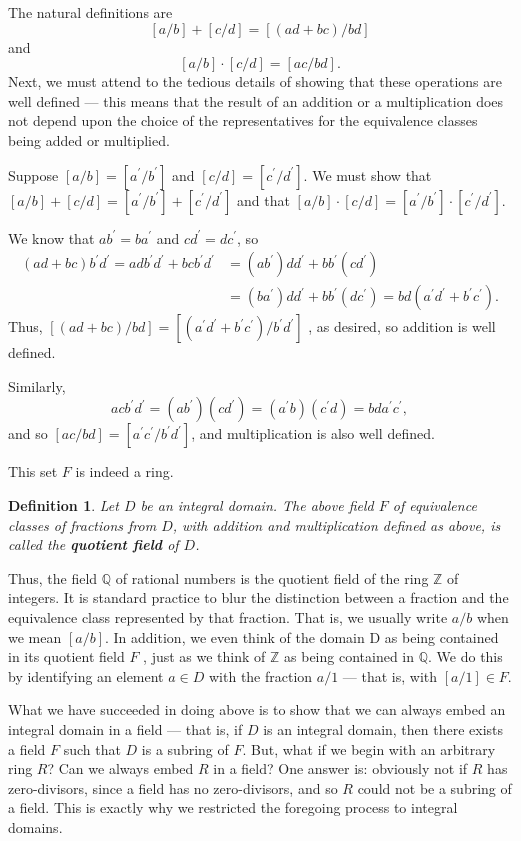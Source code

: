 \documentclass[12pt,reqno]{amsart}
\theoremstyle{plain}
\newtheorem{defi}{Definition}
\newcommand{\zz}{\mathbb Z}
\newcommand{\qq}{\mathbb Q}
\newcommand{\pp}{\prime}
\begin{document}
The natural definitions are
\[ [a/b] + [c/d] = [(ad+bc)/bd]
\]
and
\[ [a/b] \cdot [c/d] = [ac/bd].
\]
Next, we must attend to the tedious details of showing that these operations are well defined — this means that the result of an addition or a multiplication does not depend upon the choice of the representatives for the equivalence classes being added or multiplied.

Suppose $[a/b] = [a^\pp/b^\pp]$ and $[c/d] = [c^\pp/ d^\pp]$. We must show that $[a/b]+[c/d] = [a^\pp/ b^\pp] + [c^\pp / d^\pp]$ and that $[a/b] \cdot [c/d] = [a^\pp / b^\pp ] \cdot [c^\pp/ d^\pp]$.

We know that $ab^\pp = ba^\pp$ and $c d^\pp = d c^\pp$, so 
\begin{align*}
(ad+bc)b^\pp d^ \pp = adb^\pp d^\pp + bcb^\pp d^\pp &= (ab^\pp) d d^\pp + b b^\pp (c d^\pp) \\
&= (ba^\pp) d d^\pp + b b^\pp (dc^\pp) = bd (a^\pp d^\pp + b^\pp c^\pp).
\end{align*}
Thus, $[(ad + bc)/bd] = [(a^\pp d^\pp  + b^\pp c^\pp)/b^\pp d^\pp]$ , as desired, so addition is well defined. 

Similarly, 
\[
ac b^\pp d^\pp = (ab^\pp ) (c d^\pp) = (a^\pp b) (c^\pp d) = bd a^\pp c^\pp,
\]
and so $[ac/bd] = [a^\pp c^\pp / b^\pp d^\pp]$, and multiplication is also well defined. 

This set $F$ is indeed a ring.
\begin{defi} Let $D$ be an integral domain. The above field $F$ of equivalence classes of fractions from $D$, with addition and multiplication defined as above, is called the \textbf{quotient field} of $D$.
\end{defi} 

Thus, the field $\qq$ of rational numbers is the quotient field of the ring $\zz$ of integers. It is standard practice to blur the distinction between a fraction and the equivalence class represented by that fraction. That is, we usually write $a/b$ when we mean $[a/b]$. In addition, we even think of the domain D as being contained in its quotient field $F$ , just as we think of $\zz$ as being contained in $\qq$. We do this by identifying an element $a \in D$ with the fraction $a/1$ — that is, with $[a/1] \in F$.

What we have succeeded in doing above is to show that we can always embed an integral domain in a field — that is, if $D$ is an integral domain, then there exists a field $F$ such that $D$ is a subring of $F$. But, what if we begin with an arbitrary ring $R$? Can we always embed $R$ in a field? One answer is: obviously not if $R$ has zero-divisors, since a field has no zero-divisors, and so $R$ could not be a subring of a field. This is exactly why we restricted the foregoing process to integral domains.
\end{document}
